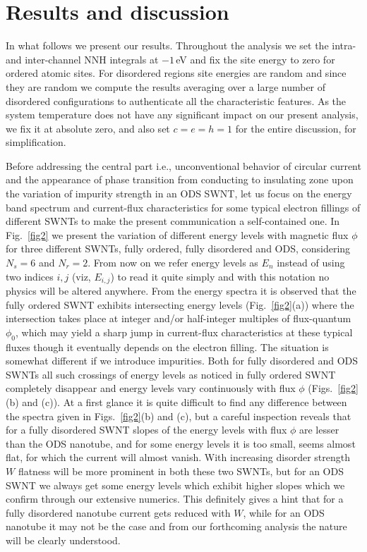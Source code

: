\documentclass[prb,aps,twocolumn,amsmath,amssymb,floatfix,
superscriptaddress]{revtex4}
\begin{document}
\section{Results and discussion}

In what follows we present our results. Throughout the analysis we set 
the intra- and inter-channel NNH integrals at $-1\,$eV and fix the site 
energy to zero for ordered atomic sites. For disordered regions site energies
are random and since they are random we compute the results averaging over
a large number of disordered configurations to authenticate all the 
characteristic features. As the system temperature does not have any 
significant impact on our present analysis, we fix it at absolute zero, and
also set $c=e=h=1$ for the entire discussion, for simplification.

Before addressing the central part i.e., unconventional behavior of circular 
current and the appearance of phase transition from conducting to insulating
zone upon the variation of impurity strength in an ODS SWNT, let us focus
on the energy band spectrum and current-flux characteristics for some 
typical electron fillings of different SWNTs to make the present 
communication a  self-contained one. In Fig.~\ref{fig2} we present
the variation of different energy levels with magnetic flux $\phi$
for three different SWNTs, fully ordered, fully disordered and ODS, 
considering $N_s=6$ and $N_r=2$.
From now on we refer energy levels as $E_n$ instead of using two indices $i,j$
(viz, $E_{i,j}$) to read it quite simply and with this notation no physics will
be altered anywhere. From the energy spectra it is observed that the fully 
ordered SWNT exhibits intersecting energy levels (Fig.~\ref{fig2}(a)) where 
the intersection takes 
place at integer and/or half-integer multiples of flux-quantum $\phi_0$, which 
may yield a sharp jump in current-flux characteristics at these typical fluxes 
though it eventually depends on the electron filling. The situation is somewhat
different if we introduce impurities. Both for fully disordered and ODS SWNTs
all such crossings of energy levels as noticed in fully ordered SWNT completely
disappear and energy levels vary continuously with flux $\phi$ 
(Figs.~\ref{fig2}(b) and (c)). At a first glance it is quite difficult to find
any difference between the spectra given in Figs.~\ref{fig2}(b) and (c), but
a careful inspection reveals that for a fully disordered SWNT slopes of the 
energy levels with flux $\phi$ are lesser than the ODS nanotube, and for some
energy levels it is too small, seems almost flat, for which the current will 
almost vanish. With increasing disorder strength $W$ flatness will be more 
prominent in both these two SWNTs, but for an ODS SWNT we always get some
energy levels which exhibit higher slopes which we confirm through our extensive
numerics. This definitely gives a hint that for a fully disordered nanotube 
current gets reduced with $W$, while for an ODS nanotube it may not be the case
and from our forthcoming analysis the nature will be clearly understood.
\end{document}
